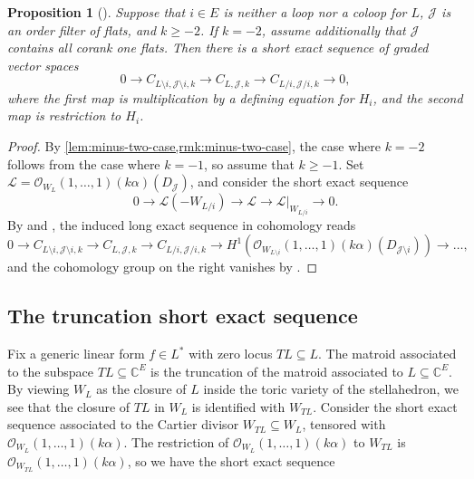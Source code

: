 \documentclass{amsart}
\newtheorem{proposition}[theorem]{Proposition}
\newcommand{\F}{\mathbb{C}}
\theoremstyle{definition}
\begin{document}
\begin{proposition}[{\cite[Proposition 3.17]{LenzHierarchical}}]
    Suppose that $i \in E$ is neither a loop nor a coloop for $L$, 
    $\mathcal{J}$ is an order filter of flats, and $k \geq 
    -2$. If $k = -2$, assume additionally that $\mathcal{J}$ contains all 
    corank one flats. Then there is a short exact sequence of graded vector spaces
    \[
    0 \to C_{L\setminus i,\mathcal{J}\setminus i,k} \to 
        C_{L,\mathcal{J},k} \to C_{L/i,\mathcal{J}/i,k} \to 0,
    \]
    where the first map is multiplication by a defining equation for 
    $H_i$, and the second map is restriction to $H_i$.
\end{proposition}
\begin{proof}
    By \cref{lem:minus-two-case,rmk:minus-two-case}, the case where 
    $k=-2$ follows from the case where $k=-1$, so assume that $k \geq 
    -1$.
    Set $\mathcal{L} = \mathcal{O}_{W_L}(1, \ldots, 
    1)(k\alpha)(D_{\mathcal{J}})$, and consider the short exact 
    sequence
    \[
        0 \to \mathcal{L}(-W_{L/i}) \to \mathcal{L} \to \mathcal{L} 
        \vert_{W_{L/i}} \to 0.
    \]
    By  and , the induced long exact sequence in cohomology reads
    \[
    0 \to C_{L\setminus i,\mathcal{J}\setminus i,k} \to 
    C_{L,\mathcal{J},k} \to C_{L/i,\mathcal{J}/i,k} \to 
    H^1(\mathcal{O}_{W_{L \setminus i}}(1, \ldots, 
    1)(k\alpha)(D_{\mathcal{J}\setminus i})) \to \ldots,
    \]
    and the cohomology group on the right vanishes by 
    .
\end{proof}

\subsection{The truncation short exact sequence}

Fix a generic linear form $f \in L^*$ with zero locus $TL \subseteq L$. The 
matroid associated to the subspace $TL \subseteq \F^E$ is the truncation 
of the matroid associated to $L \subseteq \F^E$. By viewing $W_L$ as the 
closure of $L$ inside the toric variety of the stellahedron, we see 
that the closure of $TL$ in $W_L$ is identified with $W_{TL}$. 
Consider the short exact sequence associated to the Cartier divisor $W_{TL} \subseteq 
W_L$, tensored with $\mathcal{O}_{W_L}(1, \ldots, 1)(k\alpha)$. 
The restriction of $\mathcal{O}_{W_L}(1, \ldots, 1)(k\alpha)$ to $W_{TL}$ is 
$\mathcal{O}_{W_{TL}}(1, \ldots, 1)(k\alpha)$, so we have the short exact sequence
\end{document}

